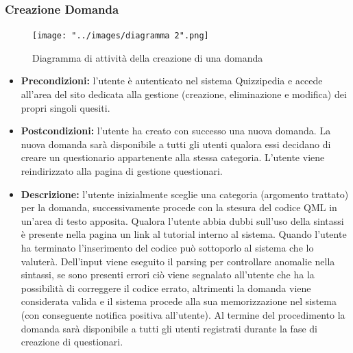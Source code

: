 \documentclass[a4paper,11pt]{article}
\begin{document}
\subsubsection{Creazione Domanda}
\begin{figure}[h!]
\begin{center}
	\centerline{\texttt{[image: "../images/diagramma 2".png]}}
	\caption{Diagramma di attività della creazione di una domanda}
\end{center}
\end{figure}
\begin{itemize}
\item\textbf{Precondizioni:} l'utente è autenticato nel sistema Quizzipedia e accede all'area del sito dedicata alla gestione (creazione, eliminazione e modifica) dei propri singoli quesiti.
\item\textbf{Postcondizioni:} l'utente ha creato con successo una nuova domanda. La nuova domanda sarà disponibile a tutti gli utenti qualora essi decidano di creare un questionario appartenente alla stessa categoria. L'utente viene reindirizzato alla pagina di gestione questionari. %
\item\textbf{Descrizione:} l'utente inizialmente sceglie una categoria (argomento trattato) per la domanda, successivamente procede con la stesura del codice QML in un'area di testo apposita. Qualora l'utente abbia dubbi sull'uso della sintassi è presente nella pagina un link al tutorial interno al sistema. Quando l'utente ha terminato l'inserimento del codice può sottoporlo al sistema che lo valuterà. Dell'input viene eseguito il parsing per controllare anomalie nella sintassi, se sono presenti errori ciò viene segnalato all'utente che ha la possibilità di correggere il codice errato, altrimenti la domanda viene considerata valida e il sistema procede alla sua memorizzazione nel sistema (con conseguente notifica positiva all'utente). Al termine del procedimento la domanda sarà disponibile a tutti gli utenti registrati durante la fase di creazione di questionari.
\end{itemize}
\newpage
\end{document}
